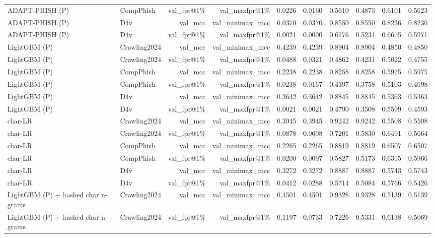 \begin{table}[t]
\begin{tabular}{llrrrrrrrr}
ADAPT-PHISH (P) & CompPhish & val\_fpr@1\% & val\_maxfpr@1\% & 0.0226 & 0.0160 & 0.5610 & 0.4873 & 0.6101 & 0.5623 \\
ADAPT-PHISH (P) & D4v & val\_mcc & val\_minimax\_mcc & 0.0370 & 0.0370 & 0.8550 & 0.8550 & 0.8236 & 0.8236 \\
ADAPT-PHISH (P) & D4v & val\_fpr@1\% & val\_maxfpr@1\% & 0.0021 & 0.0000 & 0.6176 & 0.5231 & 0.6675 & 0.5971 \\
LightGBM (P) & Crawling2024 & val\_mcc & val\_minimax\_mcc & 0.4239 & 0.4239 & 0.8904 & 0.8904 & 0.4850 & 0.4850 \\
LightGBM (P) & Crawling2024 & val\_fpr@1\% & val\_maxfpr@1\% & 0.0488 & 0.0321 & 0.4862 & 0.4231 & 0.5022 & 0.4755 \\
LightGBM (P) & CompPhish & val\_mcc & val\_minimax\_mcc & 0.2238 & 0.2238 & 0.8258 & 0.8258 & 0.5975 & 0.5975 \\
LightGBM (P) & CompPhish & val\_fpr@1\% & val\_maxfpr@1\% & 0.0238 & 0.0167 & 0.4397 & 0.3758 & 0.5103 & 0.4698 \\
LightGBM (P) & D4v & val\_mcc & val\_minimax\_mcc & 0.3642 & 0.3642 & 0.8845 & 0.8845 & 0.5363 & 0.5363 \\
LightGBM (P) & D4v & val\_fpr@1\% & val\_maxfpr@1\% & 0.0021 & 0.0021 & 0.4790 & 0.3508 & 0.5599 & 0.4593 \\
char-LR & Crawling2024 & val\_mcc & val\_minimax\_mcc & 0.3945 & 0.3945 & 0.9242 & 0.9242 & 0.5508 & 0.5508 \\
char-LR & Crawling2024 & val\_fpr@1\% & val\_maxfpr@1\% & 0.0878 & 0.0608 & 0.7201 & 0.5830 & 0.6491 & 0.5664 \\
char-LR & CompPhish & val\_mcc & val\_minimax\_mcc & 0.2265 & 0.2265 & 0.8819 & 0.8819 & 0.6507 & 0.6507 \\
char-LR & CompPhish & val\_fpr@1\% & val\_maxfpr@1\% & 0.0200 & 0.0097 & 0.5827 & 0.5173 & 0.6315 & 0.5966 \\
char-LR & D4v & val\_mcc & val\_minimax\_mcc & 0.3272 & 0.3272 & 0.8887 & 0.8887 & 0.5743 & 0.5743 \\
char-LR & D4v & val\_fpr@1\% & val\_maxfpr@1\% & 0.0412 & 0.0288 & 0.5714 & 0.5084 & 0.5766 & 0.5426 \\
LightGBM (P) + hashed char n-grams & Crawling2024 & val\_mcc & val\_minimax\_mcc & 0.4501 & 0.4501 & 0.9328 & 0.9328 & 0.5139 & 0.5139 \\
LightGBM (P) + hashed char n-grams & Crawling2024 & val\_fpr@1\% & val\_maxfpr@1\% & 0.1197 & 0.0733 & 0.7226 & 0.5331 & 0.6138 & 0.5069 \\

\end{tabular}
\end{table}
